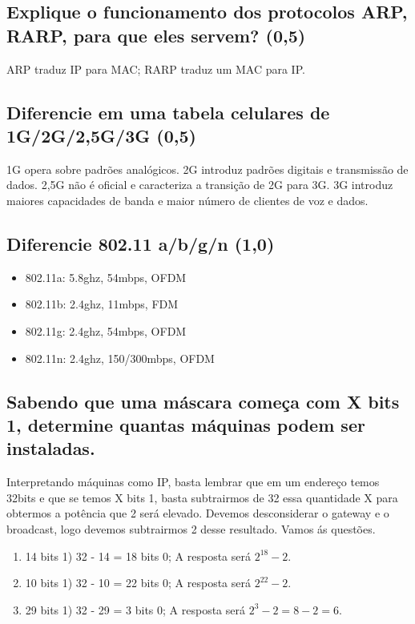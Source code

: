 \documentclass{article}
\begin{document}
\subsection{Explique o funcionamento dos protocolos ARP, RARP, para que eles servem? (0,5)}
ARP traduz IP para MAC; RARP traduz um MAC para IP.

\subsection{Diferencie em uma tabela celulares de 1G/2G/2,5G/3G (0,5)}
1G opera sobre padrões analógicos. 2G introduz padrões digitais e transmissão de
dados. 2,5G não é oficial e caracteriza a transição de 2G para 3G. 3G introduz
maiores capacidades de banda e maior número de clientes de voz e dados.

\subsection {Diferencie 802.11 a/b/g/n (1,0)}
\begin{itemize}
	\item 802.11a: 5.8ghz, 54mbps, OFDM
	\item 802.11b: 2.4ghz, 11mbps, FDM
	\item 802.11g: 2.4ghz, 54mbps, OFDM
	\item 802.11n: 2.4ghz, 150/300mbps, OFDM
\end{itemize}

\subsection{Sabendo que uma máscara começa com X bits 1, determine quantas máquinas podem ser instaladas.}
Interpretando máquinas como IP, basta lembrar que em um endereço temos 32bits e que se temos X bits 1, basta subtrairmos de 32 essa quantidade X para obtermos a potência que 2 será elevado. Devemos desconsiderar o gateway e o broadcast, logo devemos subtrairmos 2 desse resultado. Vamos ás questões.
\begin{enumerate}
	\item 14 bits 1) 32 - 14  = 18 bits 0; A resposta será $2^{18} - 2$.
	\item 10 bits 1) 32 - 10 = 22 bits 0; A resposta será $2^{22} -2$.
	\item 29 bits 1) 32 - 29 = 3 bits 0; A resposta será $2^3 - 2 = 8 - 2 = 6$.
\end{enumerate}
\end{document}
